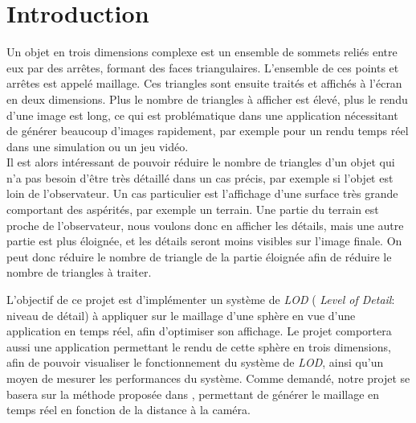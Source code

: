 \documentclass[12pt]{report}
\begin{document}



\tableofcontents

\thispagestyle{empty} %


\newpage

\chapter*{Introduction}
\setcounter{chapter}{1}

Un objet en trois dimensions complexe est un ensemble de sommets reliés
entre eux par des arrêtes, formant des faces triangulaires. L'ensemble
de ces points et arrêtes est appelé maillage. Ces triangles sont ensuite
traités et affichés à l'écran en deux dimensions. Plus le nombre de
triangles à afficher est élevé, plus le rendu d'une image est long, ce
qui est problématique dans une application nécessitant de générer
beaucoup d'images rapidement, par exemple pour un rendu temps réel dans
une simulation ou un jeu vidéo.\\
Il est alors intéressant de pouvoir réduire le nombre de triangles d'un
objet qui n'a pas besoin d'être très détaillé dans un cas précis, par
exemple si l'objet est loin de l'observateur. Un cas particulier est
l'affichage d'une surface très grande comportant des aspérités, par
exemple un terrain. Une partie du terrain est proche de l'observateur,
nous voulons donc en afficher les détails, mais une autre partie est
plus éloignée, et les détails seront moins visibles sur l'image finale.
On peut donc réduire le nombre de triangle de la partie éloignée afin de
réduire le nombre de triangles à traiter.

L'objectif de ce projet est d'implémenter un système de \emph{LOD} (
\emph{Level of Detail}: niveau de détail) à appliquer sur le maillage
d'une sphère en vue d'une application en temps réel, afin d'optimiser
son affichage. Le projet comportera aussi une application permettant le
rendu de cette sphère en trois dimensions, afin de pouvoir visualiser le
fonctionnement du système de \emph{LOD}, ainsi qu'un moyen de mesurer
les performances du système. Comme demandé, notre projet se basera sur
la méthode proposée dans \cite{CDLOD}, permettant de générer le
maillage en temps réel en fonction de la distance à la caméra. 
\end{document}
